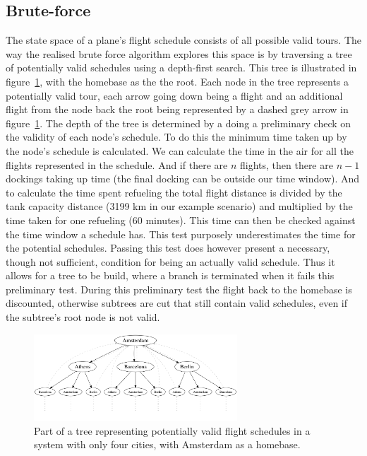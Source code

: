 \documentclass[journal]{IEEEtran}
\begin{document}
\subsection{Brute-force}
\label{subsec:bruteforce}
The state space of a plane's flight schedule consists of all possible valid tours. The way the realised brute force algorithm explores this space is by traversing a tree of potentially valid schedules using a depth-first search. This tree is illustrated in figure~\ref{fig:tree}, with the homebase as the the root. Each node in the tree represents a potentially valid tour, each arrow going down being a flight and an additional flight from the node back the root being represented by a dashed grey arrow in figure~\ref{fig:tree}. The depth of the tree is determined by a doing a preliminary check on the validity of each node's schedule. To do this the minimum time taken up by the node's schedule is calculated. We can calculate the time in the air for all the flights represented in the schedule. And if there are $n$ flights, then there are $n-1$ dockings taking up time (the final docking can be outside our time window). And to calculate the time spent refueling the total flight distance is divided by the tank capacity distance (3199 km in our example scenario) and multiplied by the time taken for one refueling (60 minutes). This time can then be checked against the time window a schedule has. This test purposely underestimates the time for the potential schedules. Passing this test does however present a necessary, though not sufficient, condition for being an actually valid schedule. Thus it allows for a tree to be build, where a branch is terminated when it fails this preliminary test. During this preliminary test the flight back to the homebase is discounted, otherwise subtrees are cut that still contain valid schedules, even if the subtree's root node is not valid.\\
\begin{figure}[!h]
\centering
\includegraphics[width=3.0in]{bruteforce_tree}
\caption{Part of a tree representing potentially valid flight schedules in a system with only four cities, with Amsterdam as a homebase.}
\label{fig:tree}
\end{figure}
\end{document}
